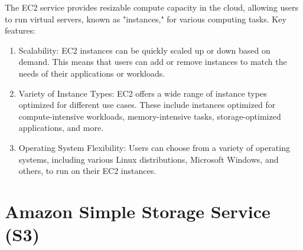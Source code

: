 \documentclass[11pt,a4paper,oneside]{report}
\begin{document}
The EC2 service \cite{awsec2} provides resizable compute capacity in the cloud, allowing users to run virtual servers, known as "instances," for various computing tasks.
Key features:
\begin{enumerate}
  \item Scalability: EC2 instances can be quickly scaled up or down based on demand. This means that users can add or remove instances to match the needs of their applications or workloads.
  \item Variety of Instance Types: EC2 offers a wide range of instance types optimized for different use cases. These include instances optimized for compute-intensive workloads, memory-intensive tasks, storage-optimized applications, and more.
  \item Operating System Flexibility: Users can choose from a variety of operating systems, including various Linux distributions, Microsoft Windows, and others, to run on their EC2 instances.
\end{enumerate}
\section{Amazon Simple Storage Service (S3)}
\end{document}
